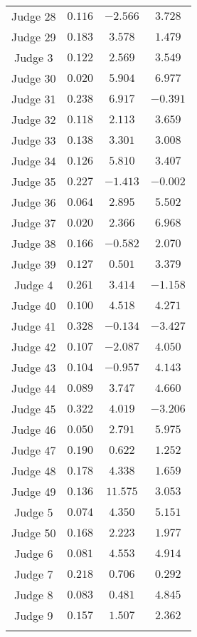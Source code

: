 \documentclass[11pt]{article}
\begin{document}
\begin{table}[H]
\begin{tabular}{@{\extracolsep{5pt}} cccc}
      Judge 28 & $0.116$ & $-2.566$ & $3.728$ \\
      Judge 29 & $0.183$ & $3.578$ & $1.479$ \\
      Judge 3 & $0.122$ & $2.569$ & $3.549$ \\
      Judge 30 & $0.020$ & $5.904$ & $6.977$ \\
      Judge 31 & $0.238$ & $6.917$ & $-0.391$ \\
      Judge 32 & $0.118$ & $2.113$ & $3.659$ \\
      Judge 33 & $0.138$ & $3.301$ & $3.008$ \\
      Judge 34 & $0.126$ & $5.810$ & $3.407$ \\
      Judge 35 & $0.227$ & $-1.413$ & $-0.002$ \\
      Judge 36 & $0.064$ & $2.895$ & $5.502$ \\
      Judge 37 & $0.020$ & $2.366$ & $6.968$ \\
      Judge 38 & $0.166$ & $-0.582$ & $2.070$ \\
      Judge 39 & $0.127$ & $0.501$ & $3.379$ \\
      Judge 4 & $0.261$ & $3.414$ & $-1.158$ \\
      Judge 40 & $0.100$ & $4.518$ & $4.271$ \\
      Judge 41 & $0.328$ & $-0.134$ & $-3.427$ \\
      Judge 42 & $0.107$ & $-2.087$ & $4.050$ \\
      Judge 43 & $0.104$ & $-0.957$ & $4.143$ \\
      Judge 44 & $0.089$ & $3.747$ & $4.660$ \\
      Judge 45 & $0.322$ & $4.019$ & $-3.206$ \\
      Judge 46 & $0.050$ & $2.791$ & $5.975$ \\
      Judge 47 & $0.190$ & $0.622$ & $1.252$ \\
      Judge 48 & $0.178$ & $4.338$ & $1.659$ \\
      Judge 49 & $0.136$ & $11.575$ & $3.053$ \\
      Judge 5 & $0.074$ & $4.350$ & $5.151$ \\
      Judge 50 & $0.168$ & $2.223$ & $1.977$ \\
      Judge 6 & $0.081$ & $4.553$ & $4.914$ \\
      Judge 7 & $0.218$ & $0.706$ & $0.292$ \\
      Judge 8 & $0.083$ & $0.481$ & $4.845$ \\
      Judge 9 & $0.157$ & $1.507$ & $2.362$ \\
      \hline \\[-1.8ex]
      \end{tabular}
    \end{table}
\end{document}
